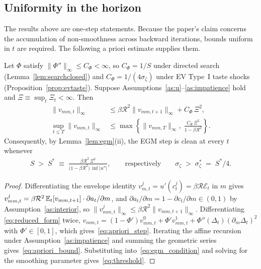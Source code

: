 \subsection{Uniformity in the horizon}
\label{subsec:smooth_uniform}

The results above are one-step statements. Because the paper's claim concerns the
accumulation of non-smoothness across backward iterations, bounds uniform in $t$ are
required. The following a priori estimate supplies them.

\begin{proposition}
\label{prop:uniform}
Let $\Phi$ satisfy $\|\Phi''\|_{\infty}\le C_\Phi<\infty$, so
$C_\Phi=1/S$ under directed search (Lemma~\ref{lem:searchclosed}) and
$C_\Phi=1/(4\sigma_\zeta)$ under EV Type~I taste shocks
(Proposition~\ref{prop:evtaste}). Suppose
Assumptions~\ref{as:u}--\ref{as:impatience} hold and $\Xi\equiv\sup_t\Xi_t<\infty$.
Then
\begin{align}
\big\|v_{mm,t}\big\|_{\infty}
&\le \beta\mathcal{R}^{2}\big\|v_{mm,t+1}\big\|_{\infty} + C_\Phi\,\Xi^{2},
\label{eq:apriori_step}\\[2pt]
\sup_{t\le T}\big\|v_{mm,t}\big\|_{\infty}
&\le \max\left\{\big\|v_{mm,T}\big\|_{\infty},\;
\frac{C_\Phi\,\Xi^{2}}{1-\beta\mathcal{R}^{2}}\right\}.
\label{eq:apriori_bound}
\end{align}
Consequently, by Lemma~\ref{lem:egm}(ii), the EGM step is clean at every $t$ whenever
\begin{align}
S \;>\; S^{\ast} \;\equiv\;
\frac{\beta\mathcal{R}^{2}\,\Xi^{2}}{\big(1-\beta\mathcal{R}^{2}\big)\,\inf\big|u''\big|},
\qquad\text{respectively}\qquad
\sigma_\zeta \;>\; \sigma_\zeta^{\ast} \;=\; S^{\ast}/4 .
\label{eq:threshold}
\end{align}
\end{proposition}

\begin{proof}
Differentiating the envelope identity $v_{m,t}^{j}=u'(c_t^{j})=\beta\mathcal{R}\mathcal{E}_t$
in $m$ gives
$v_{mm,t}^{j}=\beta\mathcal{R}^{2}\,\mathbb{E}_t[v_{mm,t+1}]\cdot\partial a_t/\partial m$, and
$\partial a_t/\partial m=1-\partial c_t/\partial m\in(0,1)$ by
Assumption~\ref{as:interior}, so
$\|v_{mm,t}^{j}\|_{\infty}\le\beta\mathcal{R}^{2}\|v_{mm,t+1}\|_{\infty}$. Differentiating
\eqref{eq:reduced_form} twice,
$v_{mm,t}=(1-\Phi')v_{mm,t}^{0}+\Phi'v_{mm,t}^{1}+\Phi''(\Delta_t)(\partial_m\Delta_t)^{2}$
with $\Phi'\in[0,1]$, which gives~\eqref{eq:apriori_step}. Iterating the affine
recursion under Assumption~\ref{as:impatience} and summing the geometric series
gives~\eqref{eq:apriori_bound}. Substituting into~\eqref{eq:egm_condition} and solving
for the smoothing parameter gives~\eqref{eq:threshold}.
\end{proof}

